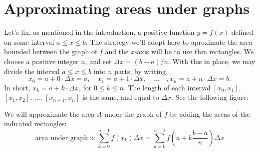 \documentclass[nooutcomes]{ximera}
\begin{document}
\section{Approximating areas under graphs}

Let's fix, as mentioned in the introduction, a positive function $y=f(x)$ defined on some interval $a \leq x \leq b$. The strategy we'll adopt here to aproximate the area bounded between the graph of $f$ and the $x$-axis will be to use thin rectangles. We choose a positive integer $n$, and set $\Delta x = (b-a)/n$. With this in place, we may divide the interval $a\leq x \leq b$ into $n$ parts, by writing $$x_0 = a+0\cdot \Delta x = a, \quad x_1 = a+1\cdot \Delta x,\quad \ldots\quad, x_n = a + n\cdot \Delta x = b.$$In short, $x_k = a+k\cdot \Delta x$, for $0\leq k \leq n$. The length of each interval $[x_0,x_1]$, $[x_1,x_2]$, ..., $[x_{n-1},x_n]$ is the same, and equal to $\Delta x$. See the following figure:

 \begin{image}
\end{image}

We will approximate the area $A$ under the graph of $f$ by adding the areas of the indicated rectangles: $$\mbox{area under graph} \approx \sum_{k=0}^{n-1} f(x_k)\Delta x = \sum_{k=0}^{n-1} f\left(a+k\frac{b-a}{n}\right) \Delta x $$
\end{document}
